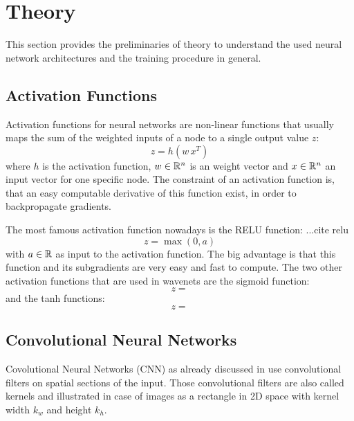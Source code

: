 
\section{Theory}\label{sec:nn_theory}
This section provides the preliminaries of theory to understand the used neural network architectures and the training procedure in general.

\subsection{Activation Functions}\label{sec:nn_theory_acti}
Activation functions for neural networks are non-linear functions that usually maps the sum of the weighted inputs of a node to a single output value $z$:
\begin{equation}\label{eq:nn_theory_acti}
  z = h(w \, x^T)
\end{equation}
where $h$ is the activation function, $w \in \mathbb{R}^n$ is an weight vector and $x \in \mathbb{R}^n$ an input vector for one specific node.
The constraint of an activation function is, that an easy computable derivative of this function exist, in order to backpropagate gradients.

The most famous activation function nowadays is the RELU function: ...cite relu
\begin{equation}\label{eq:nn_theory_relu}
  z = \max{(0, a)}
\end{equation}
with $a \in \mathbb{R}$ as input to the activation function.
The big advantage is that this function and its subgradients are very easy and fast to compute.
The two other activation functions that are used in wavenets are the sigmoid function:
\begin{equation}\label{eq:nn_theory_sigmoid}
  z = 
\end{equation}
and the tanh functions:
\begin{equation}\label{eq:nn_theory_tanh}
  z = 
\end{equation}

\subsection{Convolutional Neural Networks}\label{sec:nn_theory_cnn}
Covolutional Neural Networks (CNN) as already discussed in  use convolutional filters on spatial sections of the input.
Those convolutional filters are also called kernels and illustrated in case of images as a rectangle in 2D space with kernel width $k_w$ and height $k_h$.

